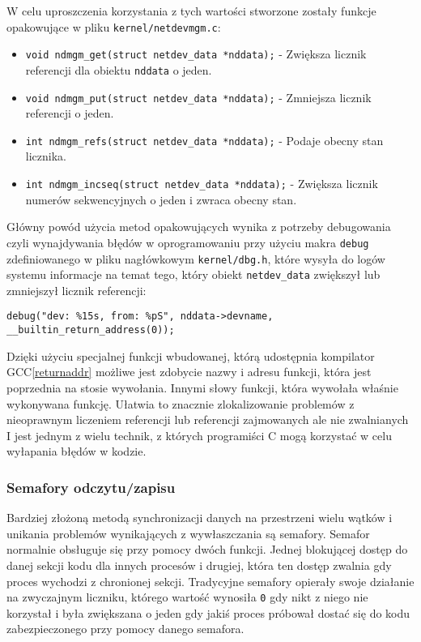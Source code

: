 \documentclass[10pt]{article}
\begin{document}
W celu uproszczenia korzystania z tych wartości stworzone zostały funkcje opakowujące w pliku \texttt{kernel/netdevmgm.c}:

\begin{itemize}
\itemsep1pt\parskip0pt
\item
  \texttt{void ndmgm\_get(struct netdev\_data *nddata);} - Zwiększa licznik referencji dla obiektu \texttt{nddata} o jeden.
\item
  \texttt{void ndmgm\_put(struct netdev\_data *nddata);} - Zmniejsza licznik referencji o jeden.
\item
  \texttt{int ndmgm\_refs(struct netdev\_data *nddata);} - Podaje obecny stan licznika.
\item
  \texttt{int ndmgm\_incseq(struct netdev\_data *nddata);} - Zwiększa licznik numerów sekwencyjnych o jeden i zwraca obecny stan.
\end{itemize}

Główny powód użycia metod opakowujących wynika z potrzeby debugowania czyli wynajdywania błędów w oprogramowaniu przy użyciu makra \texttt{debug} zdefiniowanego w pliku nagłówkowym \texttt{kernel/dbg.h}, które wysyła do logów systemu informacje na temat tego, który obiekt \texttt{netdev\_data} zwiększył lub zmniejszył licznik referencji:

\begin{verbatim}
debug("dev: %15s, from: %pS", nddata->devname, __builtin_return_address(0));
\end{verbatim}

Dzięki użyciu specjalnej funkcji wbudowanej, którą udostępnia kompilator GCC\ref{returnaddr} możliwe jest zdobycie nazwy i adresu funkcji, która jest poprzednia na stosie wywołania. Innymi słowy funkcji, która wywołała właśnie wykonywana funkcję. Ułatwia to znacznie zlokalizowanie problemów z nieoprawnym liczeniem referencji lub referencji zajmowanych ale nie zwalnianych I jest jednym z wielu technik, z których programiści C mogą korzystać w celu wyłapania błędów w kodzie.

\subsubsection{Semafory odczytu/zapisu}

Bardziej złożoną metodą synchronizacji danych na przestrzeni wielu wątków i unikania problemów wynikających z wywłaszczania są semafory.  Semafor normalnie obsługuje się przy pomocy dwóch funkcji. Jednej blokującej dostęp do danej sekcji kodu dla innych procesów i drugiej, która ten dostęp zwalnia gdy proces wychodzi z chronionej sekcji.  Tradycyjne semafory opierały swoje działanie na zwyczajnym liczniku, którego wartość wynosiła \texttt{0} gdy nikt z niego nie korzystał i była zwiększana o jeden gdy jakiś proces próbował dostać się do kodu zabezpieczonego przy pomocy danego semafora.
\end{document}
